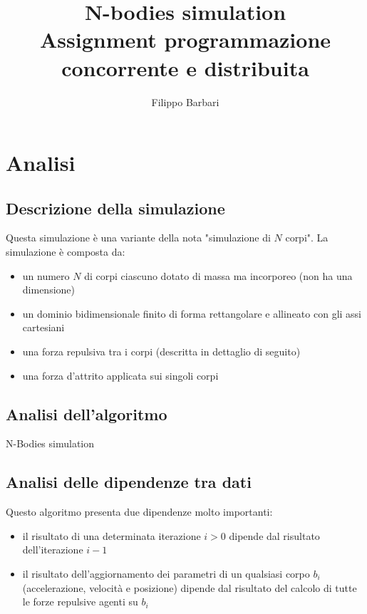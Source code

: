 \documentclass[12pt,a4paper,oneside]{article}
\begin{document}
	
	\title{N-bodies simulation\\Assignment programmazione concorrente e distribuita}
	\author{Filippo Barbari}
	\date{}%
	\maketitle
	
	\tableofcontents
	\newpage
	
	\section{Analisi}
	\subsection{Descrizione della simulazione}
	Questa simulazione è una variante della nota "simulazione di $N$ corpi". La simulazione è composta da:
	\begin{itemize}
		\item un numero $N$ di corpi ciascuno dotato di massa ma incorporeo (non ha una dimensione)
		\item un dominio bidimensionale finito di forma rettangolare e allineato con gli assi cartesiani
		\item una forza repulsiva tra i corpi (descritta in dettaglio di seguito)
		\item una forza d'attrito applicata sui singoli corpi
	\end{itemize}
	
	\subsection{Analisi dell'algoritmo}
	\begin{algorithm}
		
		\caption{N-Bodies simulation}
	\end{algorithm}
	
	\subsection{Analisi delle dipendenze tra dati}
	\label{sec:dipendenze}
	Questo algoritmo presenta due dipendenze molto importanti:
	\begin{itemize}
		\item il risultato di una determinata iterazione $i > 0$ dipende dal risultato dell'iterazione $i-1$
		\item il risultato dell'aggiornamento dei parametri di un qualsiasi corpo $b_i$ (accelerazione, velocità e posizione) dipende dal risultato del calcolo di tutte le forze repulsive agenti su $b_i$
	\end{itemize}
	
\end{document}

